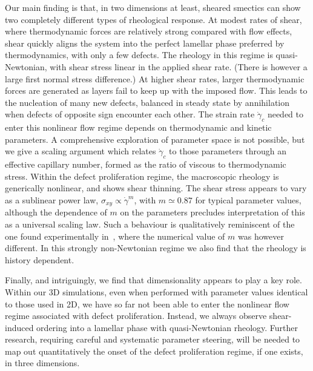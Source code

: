 \documentclass[8.5pt,twoside,twocolumn]{article}
\begin{document}
Our main finding is that, in two dimensions at least, sheared smectics can show two completely different types of rheological response. At modest rates
of shear, where thermodynamic forces are relatively strong compared with
flow effects,  shear quickly aligns the system into the perfect lamellar phase preferred by thermodynamics,
with only a few defects. The rheology in this regime is quasi-Newtonian, with shear stress linear in the applied shear rate. (There is however a large first normal stress difference.) At higher shear rates, larger thermodynamic forces are generated as layers fail to keep up with the imposed flow. This leads to the nucleation of many new defects, balanced in steady state by annihilation when defects of opposite sign encounter each other. The strain rate $\dot\gamma_c$ needed to enter this nonlinear flow regime depends on thermodynamic and kinetic parameters. A comprehensive exploration of parameter space is not possible, but we give a scaling argument which relates $\dot\gamma_c$ to those parameters through an effective capillary number, formed as the ratio of viscous to thermodynamic stress.
Within the defect proliferation regime, the macroscopic rheology is generically nonlinear, and shows shear thinning. The shear stress appears to vary as a sublinear power law, $\sigma_{xy}\propto\dot{\gamma}^m$, with $m\simeq 0.87$ for typical parameter values, although the dependence of $m$ on the parameters precludes interpretation of this as a universal scaling law.
Such a behaviour is qualitatively reminiscent of the one found experimentally in~\cite{Lu08}, where the numerical value of $m$ was however different. In this strongly non-Newtonian regime we also find that the rheology is history dependent. 

Finally, and intriguingly, we find that dimensionality appears to play a key role. Within our 3D simulations, even when performed with parameter values identical to those used in 2D, we have so far not been able to enter the nonlinear flow regime associated with defect proliferation. Instead, we always observe shear-induced ordering into a lamellar phase with quasi-Newtonian rheology. Further research, requiring careful and systematic parameter steering, will be needed to map out quantitatively the onset of the defect proliferation regime, if one exists, in three dimensions.
 
\end{document}
